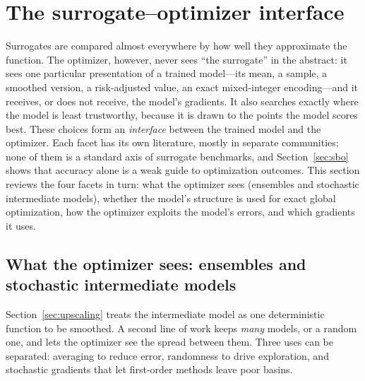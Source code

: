 \section{The surrogate--optimizer interface}
\label{sec:ensembles}

Surrogates are compared almost everywhere by how well they approximate the function. The optimizer, however, never
sees ``the surrogate'' in the abstract: it sees one particular presentation of a trained model---its mean, a sample,
a smoothed version, a risk-adjusted value, an exact mixed-integer encoding---and it receives, or does not receive,
the model's gradients. It also searches exactly where the model is least trustworthy, because it is drawn to the
points the model scores best. These choices form an \emph{interface} between the trained model and the optimizer.
Each facet has its own literature, mostly in separate communities; none of them is a standard axis of surrogate
benchmarks, and Section~\ref{sec:sbo} shows that accuracy alone is a weak guide to optimization outcomes. This section
reviews the four facets in turn: what the optimizer sees (ensembles and stochastic intermediate models), whether the
model's structure is used for exact global optimization, how the optimizer exploits the model's errors, and which
gradients it uses.

\subsection{What the optimizer sees: ensembles and stochastic intermediate models}

Section~\ref{sec:upscaling} treats the intermediate model as one deterministic function to be smoothed. A second
line of work keeps \emph{many} models, or a random one, and lets the optimizer see the spread between them. Three uses
can be separated: averaging to reduce error, randomness to drive exploration, and stochastic gradients that let
first-order methods leave poor basins.

